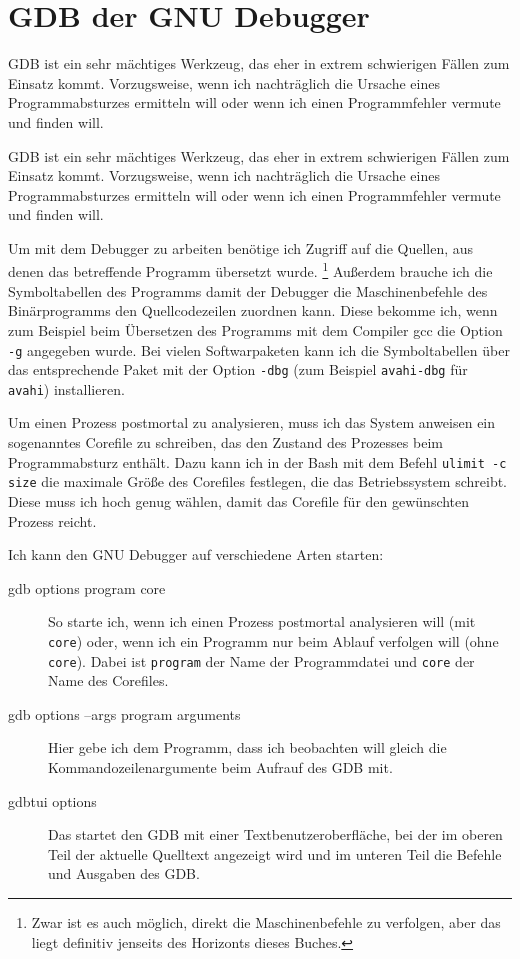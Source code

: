 \section{GDB der GNU Debugger}
\label{sec:lokal-werkzeuge-gdb}
\begin{abstractsec}
  GDB ist ein sehr mächtiges Werkzeug, das eher in extrem schwierigen Fällen
  zum Einsatz kommt. Vorzugsweise, wenn ich nachträglich die Ursache eines
  Programmabsturzes ermitteln will oder wenn ich einen Programmfehler vermute
  und finden will.
\end{abstractsec}
\begin{normaltext}
  GDB ist ein sehr mächtiges Werkzeug, das eher in extrem schwierigen Fällen
  zum Einsatz kommt. Vorzugsweise, wenn ich nachträglich die Ursache eines
  Programmabsturzes ermitteln will oder wenn ich einen Programmfehler vermute
  und finden will.

  Um mit dem Debugger zu arbeiten benötige ich Zugriff auf die Quellen, aus
  denen das betreffende Programm übersetzt wurde.
  \footnote{Zwar ist es auch möglich, direkt die Maschinenbefehle zu verfolgen,
  aber das liegt definitiv jenseits des Horizonts dieses Buches.}
  Außerdem brauche ich die Symboltabellen des Programms damit der Debugger die
  Maschinenbefehle des Binärprogramms den Quellcodezeilen zuordnen kann. Diese
  bekomme ich, wenn zum Beispiel beim Übersetzen des Programms mit dem
  Compiler gcc die Option \verb?-g? angegeben wurde. Bei vielen Softwarpaketen
  kann ich die Symboltabellen über das entsprechende Paket mit der Option
  \verb?-dbg? (zum Beispiel \verb?avahi-dbg? für \verb?avahi?) installieren.

  Um einen Prozess postmortal zu analysieren, muss ich das System anweisen ein
  sogenanntes Corefile zu schreiben, das den Zustand des Prozesses beim
  Programmabsturz enthält. Dazu kann ich in der Bash mit dem Befehl
  \verb?ulimit -c size? die maximale Größe des Corefiles festlegen, die das
  Betriebssystem schreibt. Diese muss ich hoch genug wählen, damit das
  Corefile für den gewünschten Prozess reicht.

  Ich kann den GNU Debugger auf verschiedene Arten starten:
  \begin{description}
    \item[gdb options program core] So starte ich, wenn ich einen
      Prozess postmortal analysieren will (mit \verb?core?) oder, wenn ich
      ein Programm nur beim Ablauf verfolgen will (ohne \verb?core?). Dabei
      ist \verb?program? der Name der Programmdatei und \verb?core? der Name
      des Corefiles.
    \item[gdb options --args program arguments] Hier gebe ich dem
      Programm, dass ich beobachten will gleich die Kommandozeilenargumente
      beim Aufrauf des GDB mit.
    \item[gdbtui options] Das startet den GDB mit einer
      Textbenutzeroberfläche, bei der im oberen Teil der aktuelle Quelltext
      angezeigt wird und im unteren Teil die Befehle und Ausgaben des GDB.
  \end{description}


\end{normaltext}
